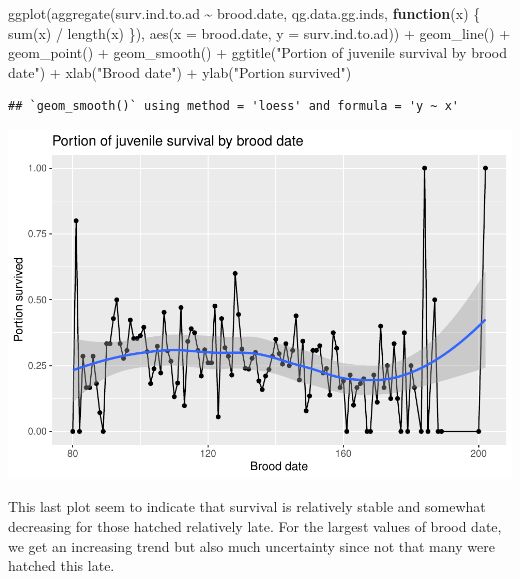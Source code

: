 \documentclass[
]{article}
\newenvironment{Shaded}{\begin{snugshade}}{\end{snugshade}}
\newcommand{\AttributeTok}[1]{\textcolor[rgb]{0.77,0.63,0.00}{#1}}
\newcommand{\ControlFlowTok}[1]{\textcolor[rgb]{0.13,0.29,0.53}{\textbf{#1}}}
\newcommand{\FunctionTok}[1]{\textcolor[rgb]{0.00,0.00,0.00}{#1}}
\newcommand{\NormalTok}[1]{#1}
\newcommand{\SpecialCharTok}[1]{\textcolor[rgb]{0.00,0.00,0.00}{#1}}
\newcommand{\StringTok}[1]{\textcolor[rgb]{0.31,0.60,0.02}{#1}}
\begin{document}
\begin{Shaded}
\begin{Highlighting}[]
\FunctionTok{ggplot}\NormalTok{(}\FunctionTok{aggregate}\NormalTok{(surv.ind.to.ad }\SpecialCharTok{\textasciitilde{}}\NormalTok{ brood.date, qg.data.gg.inds, }\ControlFlowTok{function}\NormalTok{(x) \{}
  \FunctionTok{sum}\NormalTok{(x) }\SpecialCharTok{/} \FunctionTok{length}\NormalTok{(x)}
\NormalTok{\}), }\FunctionTok{aes}\NormalTok{(}\AttributeTok{x =}\NormalTok{ brood.date, }\AttributeTok{y =}\NormalTok{ surv.ind.to.ad)) }\SpecialCharTok{+}
  \FunctionTok{geom\_line}\NormalTok{() }\SpecialCharTok{+}
  \FunctionTok{geom\_point}\NormalTok{() }\SpecialCharTok{+}
  \FunctionTok{geom\_smooth}\NormalTok{() }\SpecialCharTok{+}
  \FunctionTok{ggtitle}\NormalTok{(}\StringTok{"Portion of juvenile survival by brood date"}\NormalTok{) }\SpecialCharTok{+}
  \FunctionTok{xlab}\NormalTok{(}\StringTok{"Brood date"}\NormalTok{) }\SpecialCharTok{+}
  \FunctionTok{ylab}\NormalTok{(}\StringTok{"Portion survived"}\NormalTok{)}
\end{Highlighting}
\end{Shaded}

\begin{verbatim}
## `geom_smooth()` using method = 'loess' and formula = 'y ~ x'
\end{verbatim}

\includegraphics{EDA_files/figure-latex/unnamed-chunk-11-1.pdf}

This last plot seem to indicate that survival is relatively stable and
somewhat decreasing for those hatched relatively late. For the largest
values of brood date, we get an increasing trend but also much
uncertainty since not that many were hatched this late.
\end{document}

